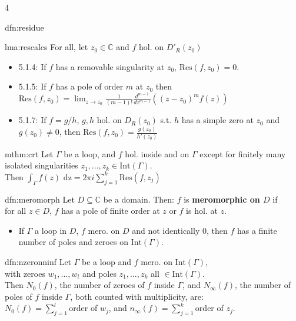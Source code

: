 \documentclass[landscape, 8pt]{extarticle}
\begin{document}
\begin{multicols*}{4}
\begin{dfn}{dfn:residue}{ }
		\end{dfn}
		
		\begin{lma}{lma:rescalcs}{ }
			For all, let $z_0 \in \mathbb{C}$ and $f$ hol. on $D'_R(z_0)$
			\begin{itemize}
				\item 5.1.4: If $f$ has a removable singularity at $z_0$, $\text{Res}(f, z_0) = 0$.
				\item 5.1.5: If $f$ has a pole of order $m$ at $z_0$ then $\text{Res}(f, z_0) = \lim_{z\to z_0}\frac{1}{(m-1)!}\frac{d^{m-1}}{dz^{m-1}}((z-z_0)^m f(z))$
				\item 5.1.7: If $f= g/h$, $g, h$ hol. on $D_R(z_0)$ s.t. $h$ has a simple zero at $z_0$ and $g(z_0) \ne 0$, then $\text{Res}(f, z_0) = \frac{g(z_0)}{h'(z_0)}$
			\end{itemize}
			
		\end{lma}
		
		
		\begin{mthm}{mthm:crt}{ }
			Let $\Gamma$ be a loop, and $f$ hol. inside and on $\Gamma$ except for finitely many isolated singularities $z_1, ..., z_k \in \text{Int}(\Gamma)$. \\
			Then $\int_{\Gamma}f(z) \text{ dz} = 2 \pi i \sum_{j = 1}^{k} \text{Res}(f, z_j)$
			
		\end{mthm}
		
		
		\begin{dfn}[Meromorphicity]{dfn:meromorph}{ }
			Let $D \subseteq \mathbb{C}$ be a domain. Then: $f$ is \textbf{meromorphic on $D$} if \\ for all $z\in D$, $f$ has a pole of finite order at $z$ or $f$ is hol. at $z$.
			\begin{itemize}
				\item If $\Gamma$ a loop in $D$, $f$ mero. on $D$ and not identically $0$, then $f$ has a finite number of poles and zeroes on $\text{Int}(\Gamma)$.
			\end{itemize}
			
		\end{dfn}
		
		
		\begin{dfn}{dfn:nzeronninf}{ }
			Let $\Gamma$ be a loop and $f$ mero. on $\text{Int}(\Gamma)$,\\
			with zeroes $w_1, ..., w_l$ and poles $z_1, ..., z_k$ all $\in \text{Int}(\Gamma)$. \\
			Then $N_0(f)$, the number of zeroes of $f$ inside $\Gamma$, and $N_\infty(f)$, the number of poles of $f$ inside $\Gamma$, both counted with multiplicity, are:\\
			$N_0(f) = \sum_{j=1}^{l}$order of $w_j$, and $n_\infty(f) = \sum_{j=1}^{k}$order of $z_j$.
			

\end{dfn}
\end{multicols*}
\end{document}
